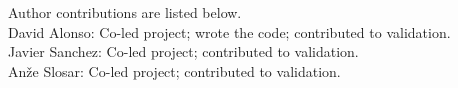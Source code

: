 Author contributions are listed below. \\
David Alonso: Co-led project; wrote the code; contributed to validation. \\
Javier Sanchez: Co-led project; contributed to validation. \\
An\v{z}e Slosar: Co-led project; contributed to validation. \\

